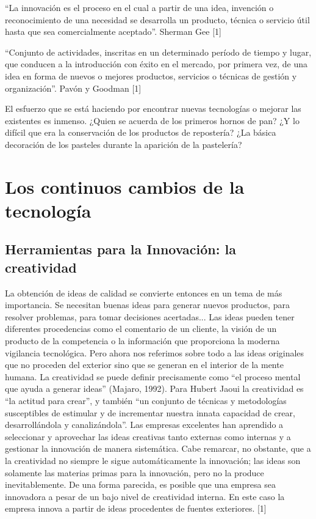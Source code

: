 \documentclass{bmcart}
\begin{document}
“La innovación es el proceso en el cual a partir de una idea, invención o reconocimiento de una necesidad se desarrolla un producto, técnica o servicio útil hasta que sea comercialmente aceptado”. Sherman Gee [1]

“Conjunto de actividades, inscritas en un determinado período de tiempo y lugar, que conducen a la introducción con éxito en el mercado, por primera vez, de una idea en forma de nuevos o mejores productos, servicios o técnicas de gestión y organización”. Pavón y Goodman [1]

El esfuerzo que se está haciendo por encontrar nuevas tecnologías o mejorar las existentes es inmenso. ¿Quien se acuerda de los primeros hornos de pan? ¿Y lo difícil que era la conservación de los productos de repostería? ¿La básica decoración de los pasteles durante la aparición de la pastelería? 


\section{Los continuos cambios de la tecnología}
\subsection{Herramientas para la Innovación: la creatividad}

La obtención de ideas de calidad se convierte entonces en un tema de más importancia. Se necesitan buenas ideas para generar nuevos productos, para resolver problemas, para tomar decisiones acertadas... Las ideas pueden tener diferentes procedencias como el comentario de un cliente, la visión de un producto de la competencia o la información que proporciona la moderna vigilancia tecnológica. Pero ahora nos referimos sobre todo a las ideas originales que no proceden del exterior sino que se generan en el interior de la mente humana. La creatividad se puede definir precisamente como “el proceso mental que ayuda a generar ideas” (Majaro, 1992). Para Hubert Jaoui la creatividad es “la actitud para crear”, y también “un conjunto de técnicas y metodologías susceptibles de estimular y de incrementar nuestra innata capacidad de crear, desarrollándola y canalizándola”.
Las empresas excelentes han aprendido a seleccionar y aprovechar las ideas creativas tanto externas como internas y a gestionar la innovación de manera sistemática. Cabe remarcar, no obstante, que a la creatividad no siempre le sigue automáticamente la innovación; las ideas son solamente las materias primas para la innovación, pero no la produce inevitablemente. De una forma parecida, es posible que una empresa sea innovadora a pesar de un bajo nivel de creatividad interna. En este caso la empresa innova a partir de ideas procedentes de fuentes exteriores. [1]
\end{document}

